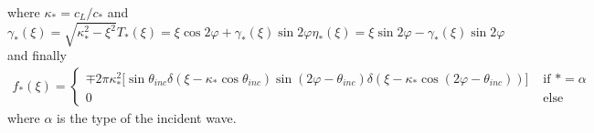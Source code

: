 where $\kappa_*=c_L/c_*$ and
\begin{subequations}
\begin{equation}
\gamma_*(\xi)=\sqrt{\kappa_*^2-\xi^2}
\end{equation}
\begin{equation}
T_*(\xi)=\xi\cos 2\varphi+\gamma_*(\xi)\sin 2\varphi
\end{equation}
\begin{equation}
\eta_*(\xi)=\xi\sin 2\varphi-\gamma_*(\xi)\sin 2\varphi
\end{equation}
\end{subequations}
and finally
\begin{eqnarray}
f_*(\xi)=\left\{
\begin{array}{cc}
\mp2\pi\kappa_*^2\lbrack \sin\theta_{inc}\delta(\xi-\kappa_*\cos\theta_{inc})\sin(2\varphi-\theta_{inc})\delta(\xi-\kappa_*\cos(2\varphi-\theta_{inc}))\rbrack & \mbox{ if } *=\alpha \\
0&\mbox{ else}
\end{array}
\right.
\end{eqnarray}
where $\alpha$ is the type of the incident wave.